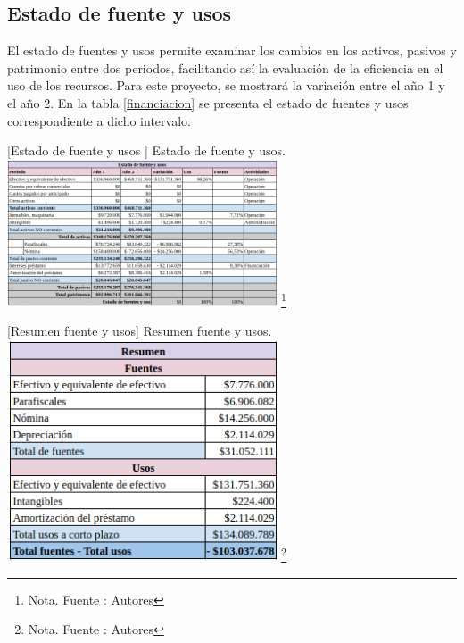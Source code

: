 \subsection{Estado de fuente y usos}

El estado de fuentes y usos permite examinar los cambios en los activos, pasivos y patrimonio entre dos periodos, facilitando así la evaluación de la eficiencia en el uso de los recursos. Para este proyecto, se mostrará la variación entre el año 1 y el año 2. En la tabla \ref{financiacion} se presenta el estado de fuentes y usos correspondiente a dicho intervalo.

\vspace{2mm}
\begin{minipage}{0.9\textwidth}
\centering
{}[{Estado de fuente y usos
}]{ Estado de fuente y usos. }
\label{financiacion}
\includegraphics[width=0.6\textwidth]{Content/Images/AF/EstadosDeFuenteYUsos.png}
\footnote{Nota. \textup{Fuente : Autores}}
\end{minipage}

\vspace{2mm}
\begin{minipage}{0.9\textwidth}
\centering
{}[{Resumen fuente y usos}]{ Resumen fuente y usos. }
\label{resumen}
\includegraphics[width=0.6\textwidth]{Content/Images/AF/EstadosDeFuenteYUsosResumen.png}
\footnote{Nota. \textup{Fuente : Autores}}
\end{minipage}
